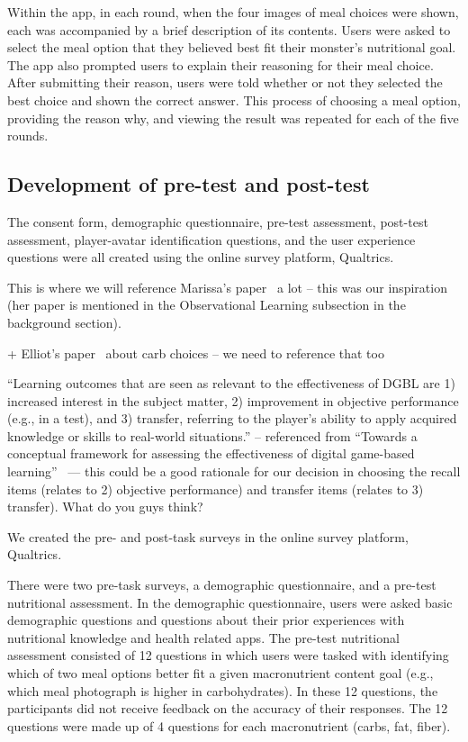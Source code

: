 Within the app, in each round, when the four images of meal choices were shown, each was accompanied by a brief description of its contents. 
Users were asked to select the meal option that they believed best fit their monster's nutritional goal. 
The app also prompted users to explain their reasoning for their meal choice.
After submitting their reason, users were told whether or not they selected the best choice and shown the correct answer.
This process of choosing a meal option, providing the reason why, and viewing the result was repeated for each of the five rounds.




\subsection{Development of pre-test and post-test }

The consent form, demographic questionnaire, pre-test assessment, post-test assessment, player-avatar identification questions, and the user experience questions were all created using the online survey platform, Qualtrics.

This is where we will reference Marissa's paper~\cite{burgermaster2017role} a lot -- this was our inspiration (her paper is mentioned in the Observational Learning subsection in the background section). 

+ Elliot's paper~\cite{mitchell2019wish} about carb choices -- we need to reference that too

``Learning outcomes that are seen as relevant to the effectiveness of DGBL are 1) increased interest in the subject matter, 2) improvement in objective performance (e.g., in a test), and 3) transfer, referring to the player's ability to apply acquired knowledge or skills to real-world situations.'' -- referenced from ``Towards a conceptual framework for assessing the effectiveness of digital game-based learning''~\cite{all2015towards}
--- this could be a good rationale for our decision in choosing the recall items (relates to 2) objective performance) and transfer items (relates to 3) transfer). What do you guys think?

We created the pre- and post-task surveys in the online survey platform, Qualtrics.

There were two pre-task surveys, a demographic questionnaire, and a pre-test nutritional assessment.
In the demographic questionnaire, users were asked basic demographic questions and questions about their prior experiences with nutritional knowledge and health related apps. The pre-test nutritional assessment consisted of 12 questions in which users were tasked with identifying which of two meal options better fit a given macronutrient content goal (e.g., which meal photograph is higher in carbohydrates). 
In these 12 questions, the participants did not receive feedback on the accuracy of their responses. 
The 12 questions were made up of 4 questions for each macronutrient (carbs, fat, fiber). 

